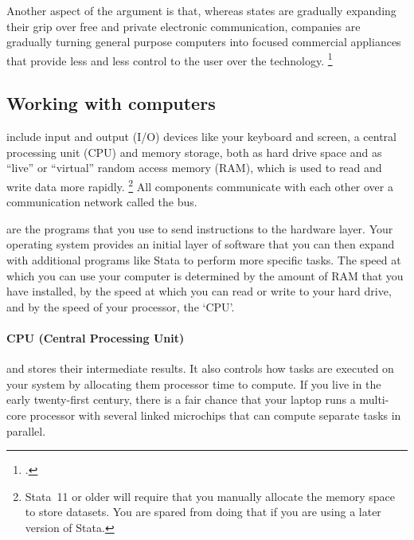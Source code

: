 Another aspect of the argument is that, whereas states are gradually expanding their grip over free and private electronic communication, companies are gradually turning general purpose computers into focused commercial appliances that provide less and less control to the user over the technology.%
  \footcite{Doctorow:2011} %

%
\subsection{Working with computers}%
  \label{ch:computers}%

%
 include input and output (I/O) devices like your keyboard and screen, a central processing unit (CPU) and memory storage, both as hard drive space and as ``live'' or ``virtual'' random access memory (RAM), which is used to read and write data more rapidly.%
  \footnote{Stata~11 or older will require that you manually allocate the memory space to store datasets. You are spared from doing that if you are using a later version of Stata.} %
  All components communicate with each other over a communication network called the bus.%
%

 are the programs that you use to send instructions to the hardware layer. Your operating system provides an initial layer of software that you can then expand with additional programs like Stata to perform more specific tasks. The speed at which you can use your computer is determined by the amount of RAM that you have installed, by the speed at which you can read or write to your hard drive, and by the speed of your processor, the `CPU'.%
%

%
\paragraph{CPU (Central Processing Unit)}%

 and stores their intermediate results. It also controls how tasks are executed on your system by allocating them processor time to compute. If you live in the early twenty-first century, there is a fair chance that your laptop runs a multi-core processor with several linked microchips that can compute separate tasks in parallel.%

